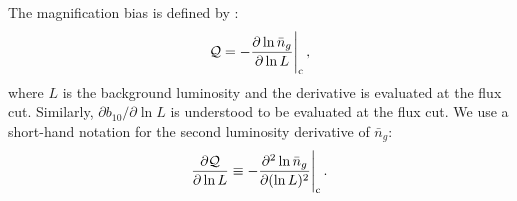The magnification bias is defined by \cite{Alonso:2015uua,DiDio:2015bua,Maartens:2019yhx}:
\begin{equation}
{\cal Q}= - \frac{\partial \ln \bar{n}_g}{\partial \ln L}\Bigg|_{\mathrm{c}}\,,
\end{equation}
where $L$ is the background luminosity and the derivative is evaluated at the flux cut. Similarly,  $\partial b_{10} / \partial \ln L$ is understood to be evaluated at the flux cut.
We use a short-hand notation for the second luminosity derivative of $\bar{n}_g$:
\begin{equation}
\frac{\partial {\cal Q}}{\partial \ln L}\equiv - \frac{\partial^2 \ln \bar{n}_g}{\partial (\ln L)^2}\Bigg|_{\mathrm{c}}\,.
\end{equation}